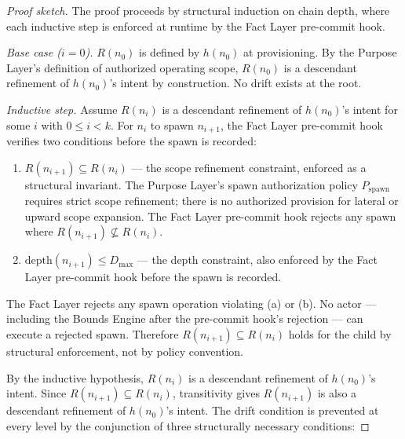 \begin{proof}[Proof sketch]
The proof proceeds by structural induction on chain depth, where each inductive step is enforced at runtime by the Fact Layer pre-commit hook.

\medskip
\textit{Base case ($i=0$).} $R(n_0)$ is defined by $h(n_0)$ at provisioning. By the Purpose Layer's definition of authorized operating scope, $R(n_0)$ is a descendant refinement of $h(n_0)$'s intent by construction. No drift exists at the root.

\medskip
\textit{Inductive step.} Assume $R(n_i)$ is a descendant refinement of $h(n_0)$'s intent for some $i$ with $0 \leq i < k$. For $n_i$ to spawn $n_{i+1}$, the Fact Layer pre-commit hook verifies two conditions before the spawn is recorded:

\begin{enumerate}
    \item[(a)] $R(n_{i+1}) \subseteq R(n_i)$ — the scope refinement constraint, enforced as a structural invariant. The Purpose Layer's spawn authorization policy $P_{\mathrm{spawn}}$ requires strict scope refinement; there is no authorized provision for lateral or upward scope expansion. The Fact Layer pre-commit hook rejects any spawn where $R(n_{i+1}) \not\subseteq R(n_i)$.
    \item[(b)] $\mathrm{depth}(n_{i+1}) \leq D_{\mathrm{max}}$ — the depth constraint, also enforced by the Fact Layer pre-commit hook before the spawn is recorded.
\end{enumerate}

The Fact Layer rejects any spawn operation violating (a) or (b). No actor — including the Bounds Engine after the pre-commit hook's rejection — can execute a rejected spawn. Therefore $R(n_{i+1}) \subseteq R(n_i)$ holds for the child by structural enforcement, not by policy convention.

By the inductive hypothesis, $R(n_i)$ is a descendant refinement of $h(n_0)$'s intent. Since $R(n_{i+1}) \subseteq R(n_i)$, transitivity gives $R(n_{i+1})$ is also a descendant refinement of $h(n_0)$'s intent. The drift condition is prevented at every level by the conjunction of three structurally necessary conditions:


\end{proof}
